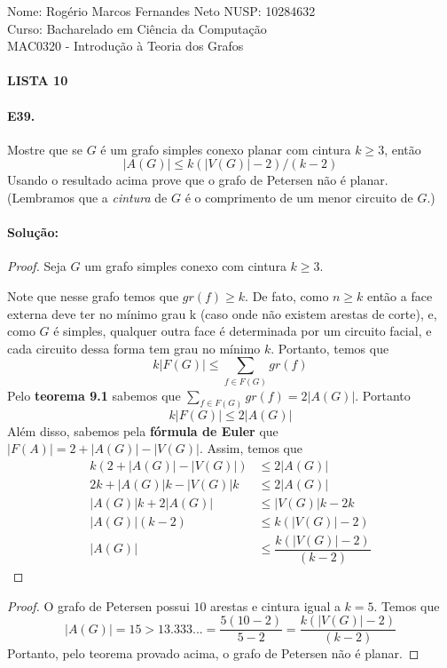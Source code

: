 \documentclass[11pt,a4paper,notitlepage]{exam}
\begin{document}
\begin{center}
    Nome: Rogério Marcos Fernandes Neto\hphantom{xxx} NUSP: 10284632\\
    Curso: Bacharelado em Ciência da Computação\\
    MAC0320 - Introdução à Teoria dos Grafos
    \paragraph{}
    \textbf{LISTA 10}
\end{center}
    \paragraph{E39.} Mostre que se $G$ é um grafo simples conexo planar
    com cintura $k \geq 3$, então 
    $$
        |A(G)| \leq k(|V(G)| -2)/(k-2)
    $$
    Usando o resultado acima prove que o grafo de Petersen não é planar.
    (Lembramos que a \textit{cintura} de $G$ é o comprimento de um menor
    circuito de $G$.)
    \paragraph{Solução:}
    \begin{proof}
        Seja $G$ um grafo simples conexo com cintura $k \geq 3$.\par
        Note que nesse grafo temos que $gr(f) \geq k$. De fato, como
        $n\geq k$ então a face externa deve ter no mínimo grau k (caso
        onde não existem arestas de corte), e, como $G$ é
        simples, qualquer outra face é determinada por um circuito
        facial, e cada circuito dessa forma tem grau no mínimo $k$.
        Portanto, temos que
        $$
        k|F(G)| \leq \sum_{f \in F(G)}gr(f)
        $$
        Pelo \textbf{teorema 9.1} sabemos que $\sum_{f \in F(G)}gr(f) =
        2|A(G)|$. Portanto
        $$
        k|F(G)| \leq 2|A(G)|
        $$
        Além disso, sabemos pela \textbf{fórmula de Euler} que $|F(A)| =
        2 +  |A(G)| - |V(G)|$. Assim, temos que
        \begin{align*}
            k(2 +  |A(G)| - |V(G)|) &\leq 2|A(G)|\\
            2k + |A(G)|k - |V(G)|k &\leq 2|A(G)|\\
            |A(G)|k + 2|A(G)| &\leq |V(G)|k - 2k\\
            |A(G)|(k-2) &\leq k(|V(G)| - 2)\\
            |A(G)| &\leq \dfrac{k(|V(G)| - 2)}{(k-2)}
        \end{align*}    
    \end{proof}
    \begin{proof}
    O grafo de Petersen possui $10$ arestas e cintura igual a $k = 5$.
    Temos que
    $$
    |A(G)| = 15 > 13.333... =  \dfrac{5(10 -2)}{5-2} =  \dfrac{k(|V(G)| - 2)}{(k-2)} 
    $$
    Portanto, pelo teorema provado acima, o grafo de Petersen não é
    planar.
    \end{proof}
    \newpage
\end{document}
